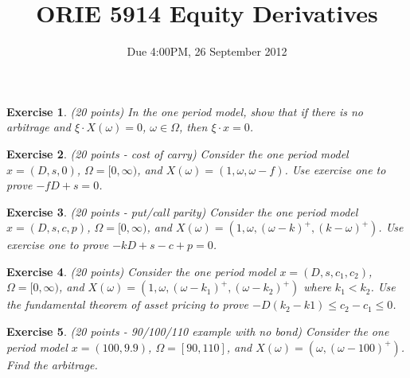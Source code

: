 \documentclass[11pt,fleqn]{amsproc}
\newtheorem{xca}{Exercise}
\begin{document}
\title{ORIE 5914 Equity Derivatives}
\author{Due 4:00PM, 26 September 2012}

\maketitle

\begin{xca}{(20 points)}
In the one period model, show that if there is no arbitrage
and \(\xi\cdot X(\omega) = 0\), \(\omega\in\Omega\), then
\(\xi\cdot x = 0\).
\end{xca}

\begin{xca}{(20 points - cost of carry)}
Consider the one period model \(x = (D, s, 0 )\), \(\Omega = [0,\infty)\),
and \(X(\omega) = (1, \omega, \omega - f)\). Use
exercise one to prove \(-fD + s = 0\).
\end{xca}

\begin{xca}{(20 points - put/call parity)}
Consider the one period model \(x = (D, s, c, p)\), \(\Omega = [0,\infty)\),
and \(X(\omega) = (1, \omega, (\omega - k)^+, (k - \omega)^+)\). Use
exercise one to prove \(-kD + s - c + p = 0\).
\end{xca}

\begin{xca}{(20 points)}
Consider the one period model \(x = (D, s, c_1, c_2)\),  \(\Omega = [0,\infty)\),
and \(X(\omega) = (1, \omega, (\omega - k_1)^+, (\omega - k_2)^+)\) where \(k_1 < k_2\). Use
the fundamental theorem of asset pricing to prove \(-D(k_2 - k1) \le c_2 - c_1 \le 0\).
\end{xca}

\begin{xca}{(20 points - 90/100/110 example with no bond)}
Consider the one period model \(x = (100, 9.9)\),  \(\Omega = [90, 110]\),
and \(X(\omega) = (\omega, (\omega - 100)^+)\). Find the arbitrage.
\end{xca}
\end{document}
